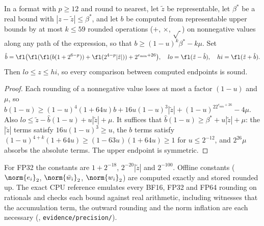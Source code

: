 \begin{lemma}\label{lem:outward}
In a format with $p\ge12$ and round to nearest, let $\tilde z$ be representable, let $\beta^\ast$ be a real bound with $|z-\tilde z|\le\beta^\ast$, and let $b$ be computed from representable upper bounds by at most $k\le59$ rounded operations ($+$, $\times$, $\sqrt{\ }$) on nonnegative values along any path of the expression, so that $b\ge(1-u)^k\beta^\ast-k\mu$. Set
\[\hat b=\fl\bigl(\fl(\fl(b(1+2^{6-p}))+\fl(2^{4-p}|\tilde z|))+2^{e_{\min}+26}\bigr),\quad lo=\fl(\tilde z-\hat b),\quad hi=\fl(\tilde z+\hat b).\]
Then $lo\le z\le hi$, so every comparison between computed endpoints is sound.
\end{lemma}
\begin{proof}
Each rounding of a nonnegative value loses at most a factor $(1-u)$ and $\mu$, so $\hat b(1-u)\ge(1-u)^4(1+64u)b+16u(1-u)^3|\tilde z|+(1-u)^22^{e_{\min}+26}-4\mu$. Also $lo\le\tilde z-\hat b(1-u)+u|\tilde z|+\mu$. It suffices that $\hat b(1-u)\ge\beta^\ast+u|\tilde z|+\mu$: the $|\tilde z|$ terms satisfy $16u(1-u)^3\ge u$, the $b$ terms satisfy $(1-u)^{4+k}(1+64u)\ge(1-63u)(1+64u)\ge1$ for $u\le2^{-12}$, and $2^{26}\mu$ absorbs the absolute terms. The upper endpoint is symmetric.
\end{proof}
For FP32 the constants are $1+2^{-18}$, $2^{-20}|\tilde z|$ and $2^{-100}$. Offline constants ($\norm{e_i}_2$, $\norm{\bar w_i}_2$, $\norm{w_i}_2$) are computed exactly and stored rounded up. The exact CPU reference emulates every BF16, FP32 and FP64 rounding on rationals and checks each bound against real arithmetic, including witnesses that the accumulation term, the outward rounding and the norm inflation are each necessary (, \nolinkurl{evidence/precision/}).

